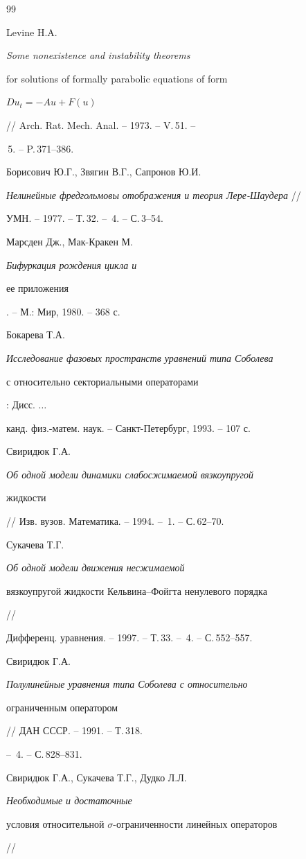 \begin{thebibliography}{99}


Levine H.A. {\it Some nonexistence and instability theorems


for solutions of formally parabolic equations of form


$Du_t=-Au+F(u)$} // Arch. Rat. Mech. Anal. -- 1973. -- V.\,51. --


\No\,5. -- P.\,371--386.




Борисович Ю.Г., Звягин В.Г., Сапронов Ю.И.


{\it Нелинейные фредгольмовы отображения и теория Лере-Шаудера} //


УМН. -- 1977. -- Т.\,32. -- \No\,4. -- С.\,3--54.




Марсден Дж., Мак-Кракен М. {\it Бифуркация рождения цикла и


ее приложения}. -- М.: Мир, 1980. -- 368 с.




Бокарева Т.А. {\it Исследование фазовых пространств уравнений типа Соболева


с относительно секториальными операторами}: Дисс. $\dotsc$


канд. физ.-матем. наук. -- Санкт-Петербург, 1993. -- 107 с.




Свиридюк Г.А. {\it Об одной модели динамики слабосжимаемой вязкоупругой 


жидкости} // Изв. вузов. Математика. -- 1994. -- \No\,1. -- С.\,62--70.




Сукачева Т.Г. {\it Об одной модели движения несжимаемой


вязкоупругой жидкости Кельвина--Фойгта ненулевого порядка} //


Дифференц. уравнения. -- 1997. -- Т.\,33. -- \No\,4. -- С.\,552--557.




Свиридюк Г.А. {\it Полулинейные уравнения типа Соболева с относительно 


ограниченным оператором} // ДАН СССР. -- 1991. -- Т.\,318.


-- \No\,4. -- С.\,828--831.




Свиридюк Г.А., Сукачева Т.Г., Дудко Л.Л. {\it Необходимые и достаточные


условия относительной $\sigma $-ограниченности линейных операторов} //



\end{thebibliography}
